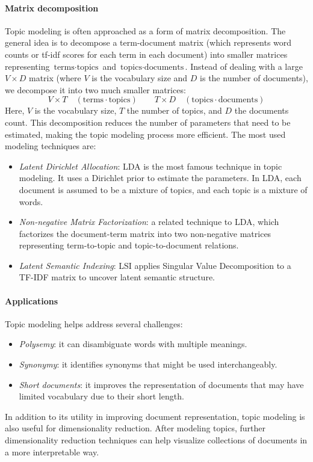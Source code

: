 \paragraph*{Matrix decomposition}
Topic modeling is often approached as a form of matrix decomposition. 
The general idea is to decompose a term-document matrix (which represents word counts or tf-idf scores for each term in each document) into smaller matrices representing $\text{terms}\cdot\text{topics}$ and $\text{topics}\cdot\text{documents}$.
Instead of dealing with a large $V\times D$ matrix (where $V$ is the vocabulary size and $D$ is the number of documents), we decompose it into two much smaller matrices: 
\[V\times T\quad  (\text{terms}\cdot\text{topics}) \qquad T\times D\quad (\text{topics}\cdot\text{documents})\]
Here, $V$ is the vocabulary size, $T$ the number of topics, and $D$ the documents count. 
This decomposition reduces the number of parameters that need to be estimated, making the topic modeling process more efficient.
The most used modeling techniques are: 
\begin{itemize}
    \item \textit{Latent Dirichlet Allocation}: LDA is the most famous technique in topic modeling. 
        It uses a Dirichlet prior to estimate the parameters.
        In LDA, each document is assumed to be a mixture of topics, and each topic is a mixture of words.
    \item \textit{Non-negative Matrix Factorization}: a related technique to LDA, which factorizes the document-term matrix into two non-negative matrices representing term-to-topic and topic-to-document relations.
    \item \textit{Latent Semantic Indexing}: LSI applies Singular Value Decomposition to a TF-IDF matrix to uncover latent semantic structure.
\end{itemize}

\paragraph*{Applications}
Topic modeling helps address several challenges:
\begin{itemize}
    \item \textit{Polysemy}: it can disambiguate words with multiple meanings.
    \item \textit{Synonymy}: it identifies synonyms that might be used interchangeably.
    \item \textit{Short documents}: it improves the representation of documents that may have limited vocabulary due to their short length.
\end{itemize}
\noindent In addition to its utility in improving document representation, topic modeling is also useful for dimensionality reduction. 
After modeling topics, further dimensionality reduction techniques can help visualize collections of documents in a more interpretable way.

